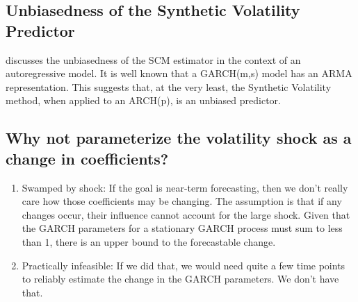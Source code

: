 \documentclass[11pt]{article}
\theoremstyle{definition}
\begin{document}
\subsection{Unbiasedness of the Synthetic Volatility Predictor}


\citet{abadie2010synthetic} discusses the unbiasedness of the SCM estimator in the context of an autoregressive model.  It is well known that a GARCH(m,s) model has an ARMA representation.  This suggests that, at the very least, the Synthetic Volatility method, when applied to an ARCH(p), is an unbiased predictor.

\subsection{Why not parameterize the volatility shock as a change in coefficients?}
\begin{enumerate}
\item Swamped by shock: If the goal is near-term forecasting, then we don't really care how those coefficients may be changing.  The assumption is that if any changes occur, their influence cannot account for the large shock. Given that the GARCH parameters for a stationary GARCH process must sum to less than 1, there is an upper bound to the forecastable change.
\item Practically infeasible: If we did that, we would need quite a few time points to reliably estimate the change in the GARCH parameters.  We don't have that.
\end{enumerate}
\end{document}
